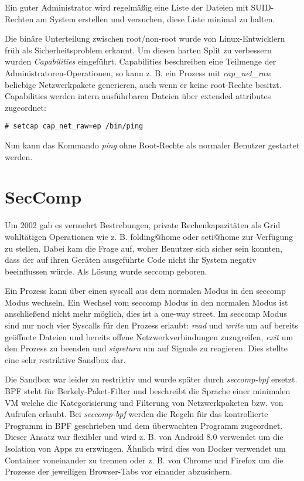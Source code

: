 Ein guter Administrator wird regelmäßig eine Liste der Dateien mit SUID-Rechten am System erstellen und versuchen, diese Liste minimal zu halten.

Die binäre Unterteilung zwischen root/non-root wurde von Linux-Entwicklern früh als Sicherheitsproblem erkannt. Um diesen harten Split zu verbessern wurden \textit{Capabilities} eingeführt. Capabilities beschreiben eine Teilmenge der Administratoren-Operationen, so kann z. B. ein Prozess mit \textit{cap\_net\_raw} beliebige Netzwerkpakete generieren, auch wenn er keine root-Rechte besitzt. Capabilities werden intern ausführbaren Dateien über extended attributes zugeordnet:

\begin{verbatim}
# setcap cap_net_raw=ep /bin/ping
\end{verbatim}

Nun kann das Kommando \textit{ping} ohne Root-Rechte als normaler Benutzer gestartet werden.

\section{SecComp}

Um 2002 gab es vermehrt Bestrebungen, private Rechenkapazitäten als Grid wohltätigen Operationen wie z. B. folding@home oder seti@home zur Verfügung zu stellen. Dabei kam die Frage auf, woher Benutzer sich sicher sein konnten, dass der auf ihren Geräten ausgeführte Code nicht ihr System negativ beeinflussen würde. Als Lösung wurde seccomp geboren.

Ein Prozess kann über einen syscall aus dem normalen Modus in den seccomp Modus wechseln. Ein Wechsel vom seccomp Modus in den normalen Modus ist anschließend nicht mehr möglich, dies ist a one-way street. Im seccomp Modus sind nur noch vier Syscalls für den Prozess erlaubt: \textit{read} und \textit{write} um auf bereits geöffnete Dateien und bereits offene Netzwerkverbindungen zuzugreifen, \textit{exit} um den Prozess zu beenden und \textit{sigreturn} um auf Signale zu reagieren. Dies stellte eine sehr restriktive Sandbox dar.

Die Sandbox war leider zu restriktiv und wurde später durch \textit{seccomp-bpf} ersetzt. BPF steht für Berkely-Paket-Filter und beschreibt die Sprache einer minimalen VM welche die Kategorisierung und Filterung von Netzwerkpaketen bzw. von Aufrufen erlaubt. Bei \textit{seccomp-bpf} werden die Regeln für das kontrollierte Programm in BPF geschrieben und dem überwachten Programm zugeordnet. Dieser Ansatz war flexibler und wird z. B. von Android 8.0 verwendet um die Isolation von Apps zu erzwingen. Ähnlich wird dies von Docker verwendet um Container voneinander zu trennen oder z. B. von Chrome und Firefox um die Prozesse der jeweiligen Browser-Tabs vor einander abzusichern.


